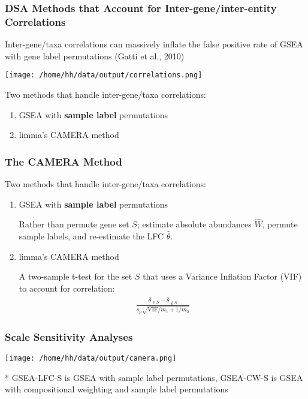 \documentclass[11pt]{beamer}
\begin{document}
\begin{frame}
  \frametitle{DSA Methods that Account for Inter-gene/inter-entity Correlations}
  Inter-gene/taxa correlations can massively inflate the false positive rate of GSEA with gene label permutations (Gatti et al., 2010)

  \begin{center}
    \texttt{[image: /home/hh/data/output/correlations.png]}
  \end{center}
  
  Two methods that handle inter-gene/taxa correlations:
  \begin{enumerate}
    \item GSEA with \textbf{sample label} permutations
    \item limma's CAMERA method
  \end{enumerate}
  
\end{frame}

\begin{frame}
  \frametitle{The CAMERA Method}
  

  Two methods that handle inter-gene/taxa correlations:
  \begin{enumerate}
  \item GSEA with \textbf{sample label} permutations
   \vspace{10px}
    
   Rather than permute gene set \(S\); estimate absolute abundances \(\hat{W}\), permute sample labels, and re-estimate the LFC \(\hat{\theta}\).

   \pause
    
  \item limma's CAMERA method

    \vspace{10px}
    A two-sample t-test for the set \(S\) that uses a Variance Inflation Factor (VIF) to account for correlation:
    \begin{align*}
      \frac{\hat{\theta}_{\in S} - \hat{\theta}_{\notin S}}{s_p\sqrt{\text{VIF}/m_1+1/m_0}}
    \end{align*} 

  \end{enumerate}
\end{frame}

\begin{frame}
  \frametitle{Scale Sensitivity Analyses}
   \begin{center}
    \texttt{[image: /home/hh/data/output/camera.png]}
   \end{center}

   \footnotesize{* GSEA-LFC-S is GSEA with sample label permutations, GSEA-CW-S is GSEA with compositional weighting and sample label permutations}
\end{frame}
\end{document}
